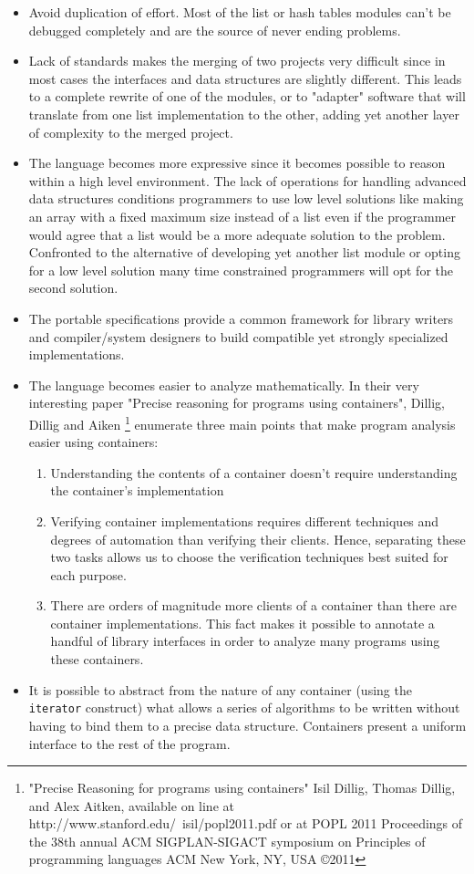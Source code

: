 \begin{itemize}
\item Avoid duplication of effort. Most of the list or hash tables modules can't be debugged completely and are the source of never ending problems.
\item Lack of standards makes the merging of two projects very difficult since in most cases the interfaces and data structures are slightly
different. This leads to a complete rewrite of one of the modules, or to "adapter" software that will translate from one list implementation
to the other, adding yet another layer of complexity to the merged project.
\item The language becomes more expressive since it becomes possible to reason within a high level environment. The lack of operations for
handling advanced data structures conditions programmers to use low level solutions like making an array with a fixed maximum size instead of a
list even if the programmer would agree that a list would be a more adequate solution to the problem. Confronted to the alternative of
developing yet another list module or opting for a low level solution many time constrained programmers will opt for the second solution.
\item
The portable specifications provide a common framework for library writers and compiler/system designers to build compatible yet strongly specialized implementations.
\item
The language becomes easier to analyze mathematically.
In their very interesting paper "Precise reasoning for programs using containers", Dillig, Dillig and Aiken
\footnote{"Precise Reasoning for programs using containers" Isil Dillig, Thomas Dillig, and Alex Aitken, available on line at
http://www.stanford.edu/\string~isil/popl2011.pdf or at POPL 2011 Proceedings of the 38th annual ACM SIGPLAN-SIGACT symposium on Principles of programming languages
ACM New York, NY, USA ©2011 } enumerate three main points that make program analysis easier using containers:
\begin{enumerate}
\item Understanding the contents of a container doesn't require understanding the container's implementation
\item Verifying container implementations requires different techniques and degrees of automation than verifying their clients. Hence, separating
these two tasks allows us to choose the verification techniques best suited for each purpose.
\item There are orders of magnitude more clients of a container than there are container implementations. This fact makes it possible to annotate
a handful of library interfaces in order to analyze many programs using these containers.
\end{enumerate}
\item It is possible to abstract from the nature of any container (using the \texttt{iterator} construct) what allows a series of algorithms to
be written without having to bind them to a precise data structure. Containers present a uniform interface to the rest of the program.
\end{itemize}
